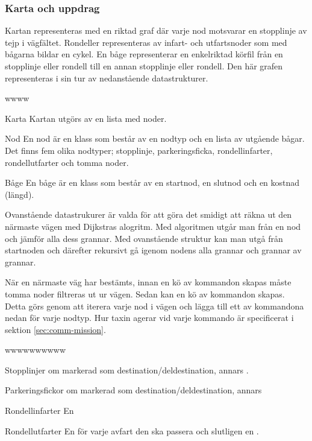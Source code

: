 \documentclass[tekniskrapport/tech.tex]{subfiles}
\begin{document}
\subsubsection{Karta och uppdrag}
\label{sec:mission}
Kartan representeras med en riktad graf där varje nod motsvarar en stopplinje
av tejp i vägfältet. Rondeller representeras av infart- och utfartsnoder som
med bågarna bildar en cykel. En båge representerar en enkelriktad körfil från
en stopplinje eller rondell till en annan stopplinje eller rondell. Den här
grafen representeras i sin tur av nedanstående datastrukturer.

\begin{labeling}{wwww}
    \item[Karta] Kartan utgörs av en lista med noder.
    \item[Nod] En nod är en klass som består av en nodtyp och en lista
        av utgående bågar. Det finns fem olika nodtyper; stopplinje,
        parkeringsficka, rondellinfarter, rondellutfarter och tomma noder. 
    \item[Båge] En båge är en klass som består av en startnod, en slutnod och
    en kostnad (längd).
\end{labeling}
Ovanstående datastrukurer är valda för att göra det smidigt att räkna ut den
närmaste vägen med Dijkstras alogritm. Med algoritmen utgår man från en nod och
jämför alla dess grannar. Med ovanstående struktur kan man utgå från startnoden
och därefter rekursivt gå igenom nodens alla grannar och grannar av grannar.

När en närmaste väg har bestämts, innan en kö av kommandon skapas måste tomma
noder filtreras ut ur vägen. Sedan kan en kö av kommandon skapas. Detta görs
genom att iterera varje nod i vägen och lägga till ett av kommandona nedan för
varje nodtyp. Hur taxin agerar vid varje kommando är specificerat i sektion
\ref{sec:comm-mission}.

\begin{labeling}{wwwwwwwwww}
    \item[Stopplinjer] {\commStop} om markerad som destination/deldestination,
        annars \commIgnore.
    \item[Parkeringsfickor] {\commPark} om markerad som
        destination/deldestination, annars \commIgnore 
    \item[Rondellinfarter] En \commEnter
    \item[Rondellutfarter] En {\commContinue} för varje avfart den ska passera
        och slutligen en \commExit.
\end{labeling}
\end{document}
